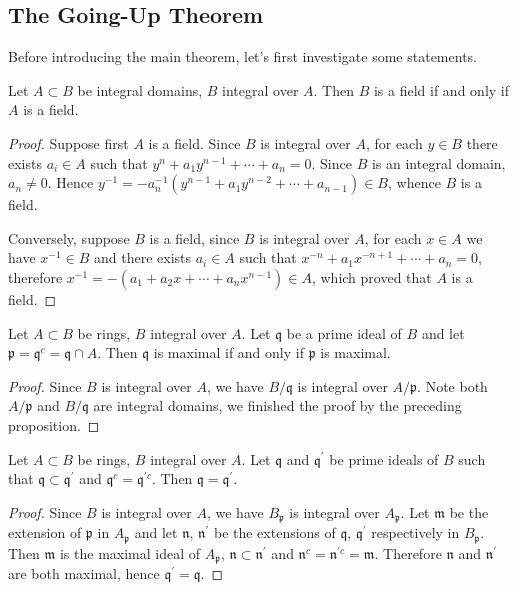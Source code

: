 \subsection{The Going-Up Theorem}
Before introducing the main theorem, let's first investigate some statements.
\begin{proposition}
Let $A\subset B$ be integral domains, $B$ integral over $A$. Then $B$ is a field if and only if $A$ is a field.
\end{proposition}
\begin{proof}
Suppose first $A$ is a field. Since $B$ is integral over $A$, for each $y\in B$ there exists $a_i\in A$ such that $y^n+a_1y^{n-1}+\cdots+a_n=0$. Since $B$ is an integral domain, $a_n\ne 0$. Hence $y^{-1}=-a_{n}^{-1}(y^{n-1}+a_1y^{n-2}+\cdots +a_{n-1})\in B$, whence $B$ is a field.\par
Conversely, suppose $B$ is a field, since $B$ is integral over $A$, for each $x\in A$ we have $x^{-1}\in B$ and there exists $a_i\in A$ such that $x^{-n}+a_1x^{-n+1}+\cdots+a_n=0$, therefore $x^{-1}=-(a_1+a_2x+\cdots+a_nx^{n-1})\in A$, which proved that $A$ is a field.
\end{proof}
\begin{corollary}
Let $A\subset B$ be rings, $B$ integral over $A$. Let $\mathfrak{q}$ be a prime ideal of $B$ and let $\mathfrak{p}=\mathfrak{q}^c=\mathfrak{q}\cap A$. Then $\mathfrak{q}$ is maximal if and only if $\mathfrak{p}$ is maximal.
\end{corollary}
\begin{proof}
Since $B$ is integral over $A$, we have $B/\mathfrak{q}$ is integral over $A/\mathfrak{p}$. Note both $A/\mathfrak{p}$ and $B/\mathfrak{q}$ are integral domains, we finished the proof by the preceding proposition.
\end{proof}
\begin{corollary}
Let $A\subset B$ be rings, $B$ integral over $A$. Let $\mathfrak{q}$ and $\mathfrak{q}^\prime$ be prime ideals of $B$ such that $\mathfrak{q}\subset\mathfrak{q}^\prime$ and $\mathfrak{q}^c=\mathfrak{q}^{\prime c}$. Then $\mathfrak{q}=\mathfrak{q}^\prime$.
\end{corollary}
\begin{proof}
Since $B$ is integral over $A$, we have $B_\mathfrak{p}$ is integral over $A_\mathfrak{p}$. Let $\mathfrak{m}$ be the extension of $\mathfrak{p}$ in $A_\mathfrak{p}$ and let $\mathfrak{n}$, $\mathfrak{n}^\prime$ be the extensions of $\mathfrak{q}$, $\mathfrak{q}^\prime$ respectively in $B_\mathfrak{p}$. Then $\mathfrak{m}$ is the maximal ideal of $A_\mathfrak{p}$, $\mathfrak{n}\subset\mathfrak{n}^\prime$ and $\mathfrak{n}^c=\mathfrak{n}^{\prime c}=\mathfrak{m}$. Therefore $\mathfrak{n}$ and $\mathfrak{n}^\prime$ are both maximal, hence $\mathfrak{q}^\prime=\mathfrak{q}$.
\end{proof}
